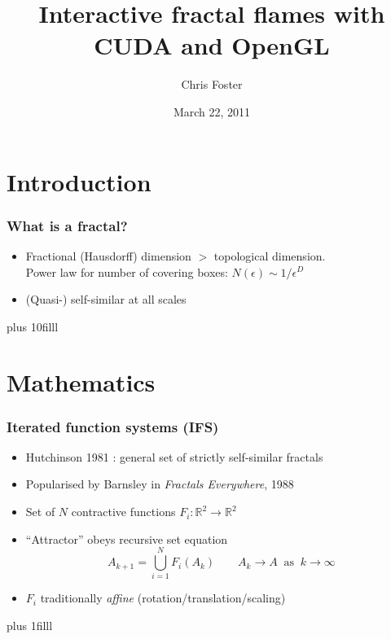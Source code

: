 \documentclass{beamer}
\title[Interactive fractal flames]{Interactive fractal flames with CUDA and OpenGL}
\author{Chris Foster}
\institute{ROAMES}
\date{March 22, 2011}
\newcommand{\vf}[1]{\vskip0pt plus #1}
\begin{document}
\begin{frame}[plain]
  \titlepage
\end{frame}



\section{Introduction}

\begin{frame}
  \frametitle{What is a fractal?}
  \begin{itemize}
    \item
      Fractional (Hausdorff) dimension $>$ topological dimension. \\
      Power law for number of covering boxes: $N(\epsilon) \sim 1/\epsilon^D$
    \item
      (Quasi-) self-similar at all scales
  \end{itemize}
  \vf{10filll}
\end{frame}



\section{Mathematics}

\begin{frame}
  \frametitle{Iterated function systems (IFS)}
  \begin{itemize}
    \item
      Hutchinson 1981 \cite{Hutchinson1981}: general set of strictly 
      self-similar fractals
    \item
      Popularised by Barnsley \cite{Barnsley1988} in \emph{Fractals Everywhere}, 1988
    \item
      Set of $N$ contractive functions $F_i \colon \mathbb{R}^2\to\mathbb{R}^2$
    \item
      ``Attractor'' obeys recursive set equation
      \[
      A_{k+1} = \bigcup_{i=1}^N F_i(A_k) \qquad
      A_k \to A \;\;\text{as}\;\; k \to \infty
      \]
    \item
      $F_i$ traditionally \emph{affine} (rotation/translation/scaling)
  \end{itemize}
  \vf{1filll}
\end{frame}
\end{document}
